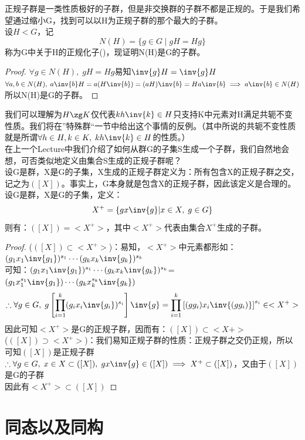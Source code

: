 正规子群是一类性质极好的子群，但是非交换群的子群不都是正规的。于是我们希望通过缩小G，找到可以以H为正规子群的那个最大的子群。\\
设$H<G$，记
\[
N(H)=\{g\in G\mid gH=Hg\}
\]
称为G中关于H的正规化子()，现证明N(H)是G的子群。
\begin{proof}
$\forall g\in N(H),\; gH=Hg$易知$\inv{g}H=\inv{g}H$\\
$\forall a,b\in N(H),\; a\inv{b}H=a(H\inv{b})=(aH)\inv{b}=Ha\inv{b}\implies a\inv{b}\in N(H)$所以N(H)是G的子群。
\end{proof}
我们可以理解为$H\zg K$仅代表$kh\inv{k}\in H$只支持K中元素对H满足共轭不变性质。我们将在”特殊群“一节中给出这个事情的反例。（其中所说的共轭不变性质就是所谓$\forall h\in H,k\in K,\;kh\inv{k}\in H$的性质。）\\
在上一个Lecture中我们介绍了如何从群G的子集S生成一个子群，我们自然地会想，可否类似地定义由集合S生成的正规子群呢？\\
设G是群，X是G的子集，X生成的正规子群定义为：所有包含X的正规子群之交，记之为$([X])$。事实上，G本身就是包含X的正规子群，因此该定义是合理的。\\
设G是群，X是G的子集，定义：
\[
X^{+}=\{gx\inv{g}|x\in X,\; g\in G\}
\]
则有：$([X])=<X^{+}>$，其中$<X^{+}>$代表由集合$X^{+}$生成的子群。
\begin{proof}
($([X])\subset<X^{+}>$)：易知，$<X^{+}>$中元素都形如：$(g_1x_1\inv{g_1})^{s_1}\cdots(g_kx_k\inv{g_k})^{s_k}$\\
可知：$(g_1x_1\inv{g_1})^{s_1}\cdots(g_kx_k\inv{g_k})^{s_k}$=$(g_1x_1^{s_1}\inv{g_1})\cdots(g_kx_k^{s_k}\inv{g_k})$\\
\[
\therefore \forall g\in G,\; g\left[\prod_{i=1}^{k}(g_ix_i\inv{g_i})^{s_i}\right]\inv{g}=\prod_{i=1}^{k}\left[(gg_i)x_i\inv{(gg_i)}\right]^{s_i}\in<X^{+}>
\]
因此可知$<X^{+}>$是G的正规子群，因而有：$([X])\subset <X{+}>$\\
($([X])\supset<X^{+}>$)：我们易知正规子群的性质：正规子群之交仍正规，所以可知$([X])$是正规子群\\
$\therefore \forall g\in G,\; x\in X\subset([X]),\; gx\inv{g}\in ([X])\implies X^{+}\subset ([X])$，又由于$([X])$是G的子群\\
因此有$<X^{+}>\subset([X])$
\end{proof}
\section{同态以及同构}

